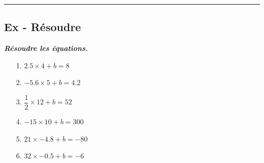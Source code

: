 \documentclass[11pt]{article}
\newcommand{\horrule}[1]{\rule{\linewidth}{#1}} %
\begin{document}
\horrule{1px} 
\begin{multicols}{2}

  \subsection*{Ex - Résoudre}
  \textit{\textbf{Résoudre les équations.}}
  \begin{itemize}
  \item[1.] $2.5 \times 4 + b = 8 $
  \item[2.] $-5.6 \times 5 + b=  4.2 $
  \item[3.] $\dfrac{1}{2}\times 12 + b = 52 $
  \item[4.] $-15 \times 10 + b = 300 $
  \item[5.] $21 \times -4.8 + b = -80 $
  \item[6.] $32 \times -0.5 + b = -6 $
  \end{itemize}

\end{multicols}
\end{document}
